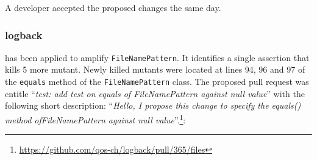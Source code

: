 \begin{figure}[H]
	\centering{}
\end{figure}

A developer accepted the proposed changes the same day.


\subsubsection{logback}

\dspot has been applied to amplify \texttt{FileNamePattern}. 
It identifies a single assertion that kills 5 more mutant. 
Newly killed mutants were located at lines 94, 96 and 97 of the \texttt{equals} method of the \texttt{FileNamePattern} class. 
The proposed pull request was entitle ``\emph{test: add test on equals of FileNamePattern against null value}'' with the following short description: ``\emph{Hello, I propose this change to specify the equals() method ofFileNamePattern against null value}''.\footnote{\url{https://github.com/qos-ch/logback/pull/365/files}}:

